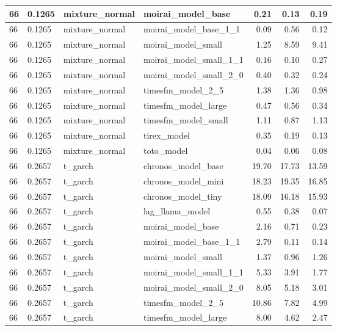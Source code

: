 {\begin{tabular}{llllrrr}
\midrule
66 & 0.1265 & mixture\_normal & moirai\_model\_base & 0.21 & 0.13 & 0.19 \\
\midrule
66 & 0.1265 & mixture\_normal & moirai\_model\_base\_1\_1 & 0.09 & 0.56 & 0.12 \\
\midrule
66 & 0.1265 & mixture\_normal & moirai\_model\_small & 1.25 & 8.59 & 9.41 \\
\midrule
66 & 0.1265 & mixture\_normal & moirai\_model\_small\_1\_1 & 0.16 & 0.10 & 0.27 \\
\midrule
66 & 0.1265 & mixture\_normal & moirai\_model\_small\_2\_0 & 0.40 & 0.32 & 0.24 \\
\midrule
66 & 0.1265 & mixture\_normal & timesfm\_model\_2\_5 & 1.38 & 1.36 & 0.98 \\
\midrule
66 & 0.1265 & mixture\_normal & timesfm\_model\_large & 0.47 & 0.56 & 0.34 \\
\midrule
66 & 0.1265 & mixture\_normal & timesfm\_model\_small & 1.11 & 0.87 & 1.13 \\
\midrule
66 & 0.1265 & mixture\_normal & tirex\_model & 0.35 & 0.19 & 0.13 \\
\midrule
66 & 0.1265 & mixture\_normal & toto\_model & 0.04 & 0.06 & 0.08 \\
\midrule
66 & 0.2657 & t\_garch & chronos\_model\_base & 19.70 & 17.73 & 13.59 \\
\midrule
66 & 0.2657 & t\_garch & chronos\_model\_mini & 18.23 & 19.35 & 16.85 \\
\midrule
66 & 0.2657 & t\_garch & chronos\_model\_tiny & 18.09 & 16.18 & 15.93 \\
\midrule
66 & 0.2657 & t\_garch & lag\_llama\_model & 0.55 & 0.38 & 0.07 \\
\midrule
66 & 0.2657 & t\_garch & moirai\_model\_base & 2.16 & 0.71 & 0.23 \\
\midrule
66 & 0.2657 & t\_garch & moirai\_model\_base\_1\_1 & 2.79 & 0.11 & 0.14 \\
\midrule
66 & 0.2657 & t\_garch & moirai\_model\_small & 1.37 & 0.96 & 1.26 \\
\midrule
66 & 0.2657 & t\_garch & moirai\_model\_small\_1\_1 & 5.33 & 3.91 & 1.77 \\
\midrule
66 & 0.2657 & t\_garch & moirai\_model\_small\_2\_0 & 8.05 & 5.18 & 3.01 \\
\midrule
66 & 0.2657 & t\_garch & timesfm\_model\_2\_5 & 10.86 & 7.82 & 4.99 \\
\midrule
66 & 0.2657 & t\_garch & timesfm\_model\_large & 8.00 & 4.62 & 2.47 \\
\midrule

\end{tabular}}
